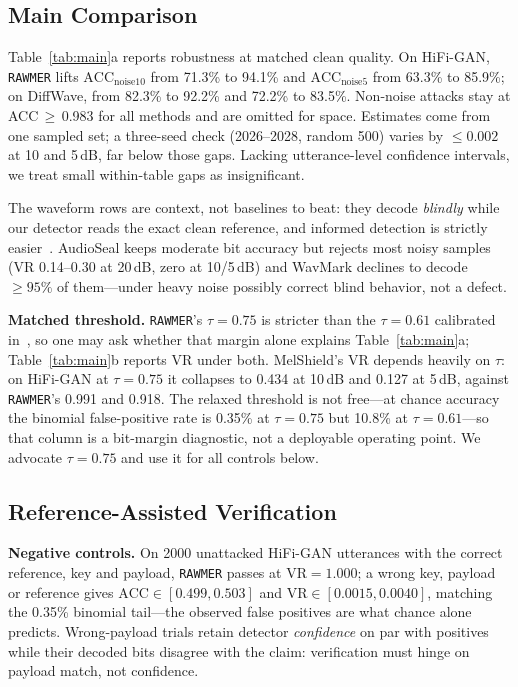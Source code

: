 \subsection{Main Comparison}

Table~\ref{tab:main}a reports robustness at matched clean quality. On HiFi-GAN,
\texttt{RAWMER} lifts $\text{ACC}_{\text{noise10}}$ from 71.3\% to 94.1\% and
$\text{ACC}_{\text{noise5}}$ from 63.3\% to 85.9\%; on DiffWave, from 82.3\% to
92.2\% and 72.2\% to 83.5\%. Non-noise attacks stay at ACC\,$\geq\,$0.983 for all methods and are omitted for
space. Estimates come from one sampled set; a three-seed check (2026--2028, random 500)
varies by $\leq 0.002$ at 10 and 5\,dB, far below those gaps. Lacking
utterance-level confidence intervals, we treat small within-table gaps as
insignificant.

The waveform rows are context, not baselines to beat: they decode \emph{blindly}
while our detector reads the exact clean reference, and informed detection is strictly
easier~\cite{cox2008}. AudioSeal keeps moderate bit accuracy but rejects most noisy
samples (VR 0.14--0.30 at 20\,dB, zero at 10/5\,dB) and WavMark declines to decode
$\geq\!95\%$ of them---under heavy noise possibly correct blind behavior, not a
defect.

\textbf{Matched threshold.} \texttt{RAWMER}'s $\tau = 0.75$ is stricter than the
$\tau = 0.61$ calibrated in~\cite{jin2026}, so one may ask whether that margin alone
explains Table~\ref{tab:main}a; Table~\ref{tab:main}b reports VR under both.
MelShield's VR depends heavily on $\tau$: on HiFi-GAN at $\tau = 0.75$ it collapses to
0.434 at 10\,dB and 0.127 at 5\,dB, against \texttt{RAWMER}'s 0.991 and 0.918. The
relaxed threshold is not free---at chance accuracy the binomial false-positive rate is
0.35\% at $\tau = 0.75$ but 10.8\% at $\tau = 0.61$---so that column is a bit-margin
diagnostic, not a deployable operating point. We advocate $\tau = 0.75$ and use it for
all controls below.

\subsection{Reference-Assisted Verification}

\textbf{Negative controls.} On 2000 unattacked HiFi-GAN utterances with the correct
reference, key and payload, \texttt{RAWMER} passes at $\text{VR} = 1.000$; a wrong
key, payload or reference gives $\text{ACC} \in [0.499,0.503]$ and
$\text{VR} \in [0.0015,0.0040]$, matching the 0.35\% binomial tail---the observed
false positives are what chance alone predicts. Wrong-payload trials retain detector
\emph{confidence} on par with positives while their decoded bits disagree with the
claim: verification must hinge on payload match, not confidence.

